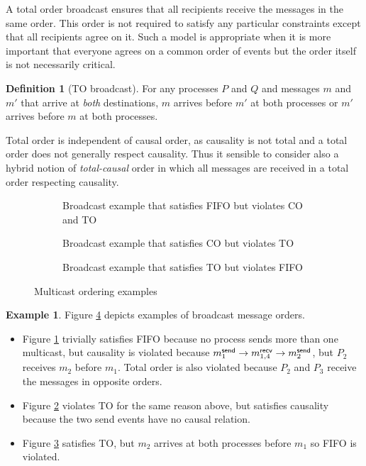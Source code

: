 \documentclass[]             %
{NASA}                       %
\theoremstyle{definition}
\newtheorem{example}[theorem]{Example}
\newtheorem{definition}[theorem]{Definition}
\providecommand{\tightlist}{%
  \setlength{\itemsep}{0pt}\setlength{\parskip}{0pt}}
\begin{document}
A total order broadcast ensures that all recipients receive the
messages in the same order. This order is not required to satisfy any
particular constraints except that all recipients agree on it. Such a
model is appropriate when it is more important that everyone agrees on
a common order of events but the order itself is not necessarily
critical.

\begin{definition}[TO broadcast]
  \label{def:totalorderbroadcast} For any processes $P$ and $Q$ and
  messages $m$ and $m'$ that arrive at \emph{both} destinations, $m$
  arrives before $m'$ at both processes or $m'$ arrives before $m$ at
  both processes.
\end{definition}

Total order is independent of causal order, as causality is not total
and a total order does not generally respect causality. Thus it
sensible to consider also a hybrid notion of \emph{total-causal} order
in which all messages are received in a total order respecting
causality.

\begin{figure}[p]
  \setlength\belowcaptionskip{5ex}
  \begin{subfigure}{1\textwidth}
    \centering
    
    \caption{Broadcast example that satisfies FIFO but violates CO and TO}
    \label{fig:bcast-order-examples-1}
  \end{subfigure}
  \begin{subfigure}{1\textwidth}
    \centering
    
    \caption{Broadcast example that satisfies CO but violates TO}
    \label{fig:bcast-order-examples-2}
  \end{subfigure}
  \begin{subfigure}{1\textwidth}
    \centering
    
    \caption{Broadcast example that satisfies TO but violates FIFO}
    \label{fig:bcast-order-examples-3}
  \end{subfigure}
  \caption{Multicast ordering examples}
  \label{fig:bcast-ordering-examples}
\end{figure}

\begin{example}
Figure \ref{fig:bcast-ordering-examples} depicts examples of broadcast
message orders.
\begin{itemize}
  \tightlist
\item Figure \ref{fig:bcast-order-examples-1} trivially satisfies FIFO
  because no process sends more than one multicast, but causality is
  violated because $m_{1}^{\mathsf{send}} \to m_{1,4}^{\mathsf{recv}} \to m_{2}^{\mathsf{send}}$, but
  $P_2$ receives $m_2$ before $m_1$. Total order is also violated
  because $P_2$ and $P_3$ receive the messages in opposite orders.
\item Figure \ref{fig:bcast-order-examples-2} violates TO for the same
  reason above, but satisfies causality because the two send events
  have no causal relation.
\item Figure \ref{fig:bcast-order-examples-3}
  satisfies TO, but $m_2$ arrives at both processes before $m_1$ so
  FIFO is violated.
\end{itemize}
\end{example}
\end{document}
